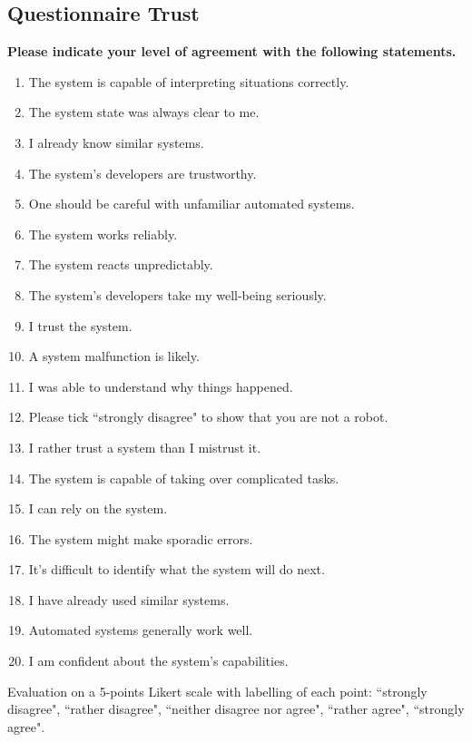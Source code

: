 \subsection{Questionnaire Trust}
\textbf{Please indicate your level of agreement with the following statements.}
\begin{enumerate}
	\item The system is capable of interpreting situations correctly.
	\item The system state was always clear to me.
	\item I already know similar systems.
	\item The system's developers are trustworthy.
	\item One should be careful with unfamiliar automated systems.
	\item The system works reliably.
	\item The system reacts unpredictably.
	\item The system's developers take my well-being seriously.
	\item I trust the system.
	\item A system malfunction is likely.
	\item I was able to understand why things happened.
	\item Please tick ``strongly disagree" to show that you are not a robot.
	\item I rather trust a system than I mistrust it.
	\item The system is capable of taking over complicated tasks.
	\item I can rely on the system.
	\item The system might make sporadic errors.
	\item It's difficult to identify what the system will do next.
	\item I have already used similar systems.
	\item Automated systems generally work well.
	\item I am confident about the system's capabilities.
\end{enumerate}
Evaluation on a 5-points Likert scale with labelling of each point: ``strongly disagree", ``rather disagree", ``neither disagree nor agree", ``rather agree", ``strongly agree".



